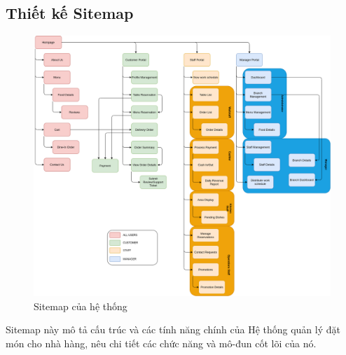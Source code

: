 \subsection{Thiết kế Sitemap}

\begin{figure}[H]
    \centering
    \includegraphics[width=\linewidth]{Images/sitemap.png}
    \vspace{0.5cm}
    \caption{Sitemap của hệ thống}
    \label{fig:my_label}
\end{figure}

Sitemap này mô tả cấu trúc và các tính năng chính của Hệ thống quản lý đặt món cho nhà hàng, nêu chi tiết các chức năng và mô-đun cốt lõi của nó.

